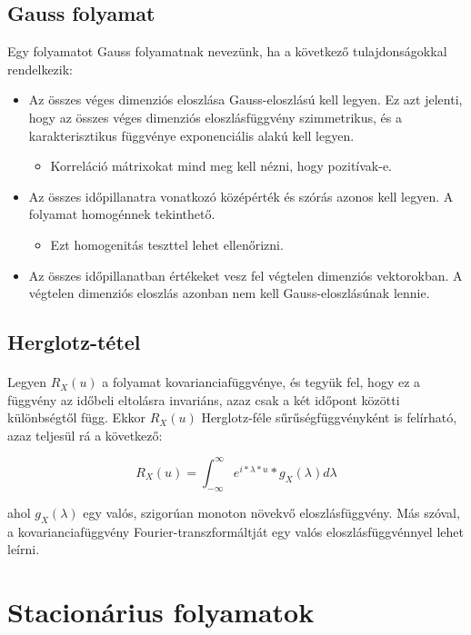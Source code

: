 \documentclass[11pt,a4pape,draftr]{article}
\begin{document}
			\subsection{Gauss folyamat}
			Egy folyamatot Gauss folyamatnak nevezünk, ha a következő tulajdonságokkal rendelkezik:
			\begin{itemize}
				\item Az összes véges dimenziós eloszlása Gauss-eloszlású kell legyen. Ez azt jelenti, hogy az összes véges dimenziós eloszlásfüggvény szimmetrikus, és a karakterisztikus függvénye exponenciális alakú kell legyen.
				\begin{itemize}
					\item Korreláció mátrixokat mind meg kell nézni, hogy pozitívak-e.
				\end{itemize}
					\item Az összes időpillanatra vonatkozó középérték és szórás azonos kell legyen. A folyamat homogénnek tekinthető.
				\begin{itemize}
					\item Ezt homogenitás teszttel lehet ellenőrizni.
				\end{itemize}
				\item Az összes időpillanatban értékeket vesz fel végtelen dimenziós vektorokban. A végtelen dimenziós eloszlás azonban nem kell Gauss-eloszlásúnak lennie.
			\end{itemize}
			\subsection{Herglotz-tétel}
				\paragraph{}
					Legyen $R_X (u)$ a folyamat kovarianciafüggvénye, és tegyük fel, hogy ez a függvény az időbeli eltolásra invariáns, azaz csak a két időpont közötti különbségtől függ. Ekkor $R_X (u)$ Herglotz-féle sűrűségfüggvényként is felírható, azaz teljesül rá a következő:

					$$R_X (u)=\int_{-\infty}^\infty e^{i*\lambda*u}*g_X(\lambda)d\lambda$$

					ahol $g_X(\lambda)$ egy valós, szigorúan monoton növekvő eloszlásfüggvény. Más szóval, a kovarianciafüggvény Fourier-transzformáltját egy valós eloszlásfüggvénnyel lehet leírni.
		\section{Stacionárius folyamatok}
\end{document}
